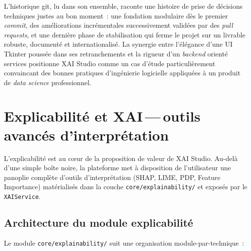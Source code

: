 \documentclass[11pt,a4paper]{report}
\begin{document}
L'historique git, lu dans son ensemble, raconte une histoire de
prise de d\'ecisions techniques justes au bon moment~: une
fondation modulaire d\`es le premier \textit{commit}, des
am\'eliorations incr\'ementales successivement valid\'ees par des
\textit{pull requests}, et une derni\`ere phase de stabilisation qui
ferme le projet sur un livrable robuste, document\'e et internationalis\'e.
La synergie entre l'\'el\'egance d'une UI Tkinter pouss\'ee dans ses
retranchements et la rigueur d'un \textit{backend} orient\'e
services positionne XAI Studio comme un cas d'\'etude
particuli\`erement convaincant des bonnes pratiques d'ing\'enierie
logicielle appliqu\'ees \`a un produit de \textit{data science}
professionnel.


\chapter{Explicabilit\'e et XAI\,---\,outils avanc\'es d'interpr\'etation}

L'explicabilit\'e est au c\oe{}ur de la proposition de valeur de XAI Studio.
Au-del\`a d'une simple bo\^ite noire, la plateforme met \`a disposition de
l'utilisateur une panoplie compl\`ete d'outils d'interpr\'etation
(SHAP, LIME, PDP, Feature Importance) mat\'erialis\'es dans la couche
\texttt{core/explainability/} et expos\'es par le \texttt{XAIService}.

\section{Architecture du module explicabilit\'e}

Le module \texttt{core/explainability/} suit une organisation
module-par-technique~:
\end{document}
